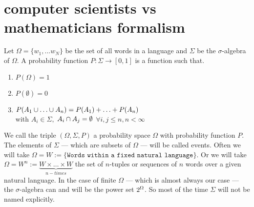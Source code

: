 \documentclass[•]{book}
\begin{document}
\section{computer scientists vs mathematicians formalism}
Let $\Omega=\{w_1,...w_N\}$ be the set of all words in a language and $\Sigma$ be the $\sigma$-algebra of $\Omega$.
A probability function $P:\Sigma \to [0,1]$ is a function such that.
\begin{enumerate}
  \item $P(\Omega) = 1$
  \item $P(\emptyset) = 0$
  \item $P(A_1 \cup \ldots \cup A_n) = P(A_1) + \ldots + P(A_n)$ \\
with $A_i\in\Sigma,$ $A_i \cap A_j = \emptyset$ $\forall i,j \leq n, n < \infty$
\end{enumerate}
We call the triple $(\Omega, \Sigma, P)$ a probability space $\Omega$ with probability function $P$.
The elements of $\Sigma$ --- which are subsets of $\Omega$ ---  will be called events. 
Often we will take $\Omega = W := \{\texttt{Words within a fixed natural language}\}.$
Or we will take $\Omega = W^n :=\underbrace{W\times\dots\times W}_{n-times}$ the set of $n$-tuples or sequences of $n$ words over a given natural language. 
In the case of finite $\Omega$ --- which is almost always our case --- the $\sigma$-algebra can and will be the power set $2^{\Omega}$.
So most of the time $\Sigma$ will not be named explicitly.  
\end{document}
